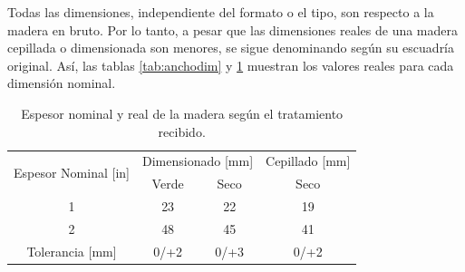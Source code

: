 Todas las dimensiones, independiente del formato o el tipo, son respecto a la madera en bruto. Por lo tanto, a pesar que las dimensiones reales de una madera cepillada o dimensionada son menores, se sigue denominando según su escuadría original. Así, las tablas \ref{tab:anchodim} y \ref{tab:espdim} muestran los valores reales para cada dimensión nominal.

\begin{table}[H]
\centering
\begin{tabular}{@{}cccc@{}}
\toprule
\multirow{2}{*}{Espesor Nominal {[}in{]}} & \multicolumn{2}{c}{Dimensionado {[}mm{]}} & Cepillado {[}mm{]} \\ \cmidrule(l){2-4} 
                                  & Verde                & Seco               & Seco               \\ \midrule
1                                 & 23                   & 22                 & 19                 \\
2                                 & 48                   & 45                 & 41                 \\ \midrule
Tolerancia {[}mm{]}               & 0/+2                 & 0/+3               & 0/+2               \\ \bottomrule
\end{tabular}
\caption{Espesor nominal y real de la madera según el tratamiento recibido.}
\label{tab:espdim}
\end{table}

